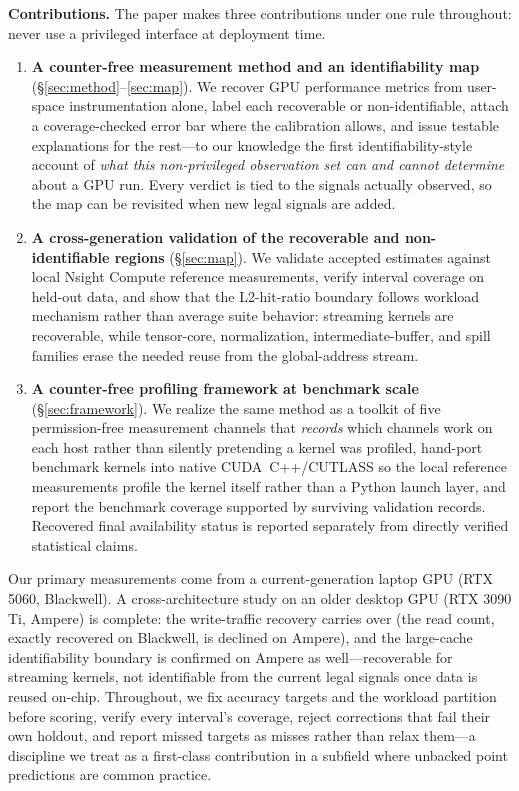 \documentclass[conference]{IEEEtran}
\begin{document}
\smallskip
\noindent\textbf{Contributions.} The paper makes three contributions under
one rule throughout: never use a privileged interface at deployment time.

\begin{enumerate}
\item \textbf{A counter-free measurement method and an identifiability map}
(\S\ref{sec:method}--\ref{sec:map}). We recover GPU performance metrics from
user-space instrumentation alone, label each recoverable or non-identifiable,
attach a coverage-checked error bar where the calibration allows, and issue
testable explanations for the rest---to our knowledge the first
identifiability-style account of \emph{what this non-privileged observation
set can and cannot determine} about a GPU run. Every verdict is tied to the
signals actually observed, so the map can be revisited when new legal signals
are added.

\item \textbf{A cross-generation validation of the recoverable and
non-identifiable regions}
(\S\ref{sec:map}). We validate accepted estimates against local Nsight
Compute reference measurements, verify interval coverage on held-out data, and show that
the L2-hit-ratio boundary follows workload mechanism rather than average
suite behavior: streaming kernels are recoverable, while tensor-core,
normalization, intermediate-buffer, and spill families erase the needed reuse
from the global-address stream.

\item \textbf{A counter-free profiling framework at benchmark scale}
(\S\ref{sec:framework}). We realize the same method as a toolkit of five
permission-free measurement channels that \emph{records} which channels work
on each host rather than silently pretending a kernel was profiled, hand-port
benchmark kernels into native CUDA~C++/CUTLASS so the local reference
measurements profile the kernel itself rather than a Python launch layer, and report the
benchmark coverage supported by surviving validation records. Recovered final
availability status is reported separately from directly verified statistical
claims.
\end{enumerate}

\noindent Our primary measurements come from a current-generation laptop GPU (RTX
5060, Blackwell). A cross-architecture study on an older desktop GPU (RTX 3090 Ti,
Ampere) is complete: the write-traffic recovery carries over
(the read count, exactly recovered on Blackwell, is declined on Ampere), and
the large-cache identifiability boundary is confirmed on Ampere as
well---recoverable for streaming kernels, not identifiable from the current
legal signals once data is reused on-chip. Throughout, we fix accuracy targets and the workload partition
before scoring, verify every interval's coverage, reject corrections that fail
their own holdout, and report missed targets as misses rather than relax
them---a discipline we treat as a first-class contribution in a subfield where
unbacked point predictions are common practice.
\end{document}
